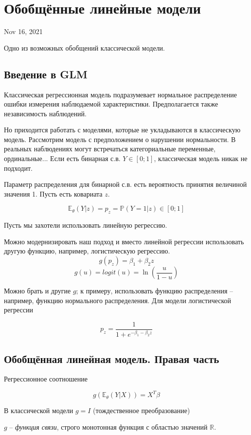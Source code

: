 \documentclass[main.tex]{subfiles}
\begin{document}
\section{ Обобщённые линейные модели}
Nov 16, 2021

Одно из возможных обобщений классической модели.

\subsection{Введение в GLM}

Классическая регрессионная модель подразумевает нормальное распределение ошибки измерения наблюдаемой характеристики.
Предполагается также независимость наблюдений.

Но приходится работать с моделями, которые не укладываются в классическую модель.
Рассмотрим модель с предположением о нарушении нормальности.
В реальных наблюдениях могут встречаться категориальные переменные, ординальные...
Если есть бинарная с.в. $ Y \in [0;1] $, классическая модель никак не подходит.

Параметр распределения для бинарной с.в. есть вероятность принятия величиной значения 1.
Пусть есть ковариата $z$.

\[ \mathds E_\theta (Y|z) = p_z = \mathds P(Y=1|z) \in [0;1] \]

Пусть мы захотели использовать линейную регрессию.


Можно модернизировать наш подход и вместо линейной регрессии использовать другую функцию, например, логистическую регрессию.
\[ g(p_z) = \beta_1 + \beta_2 z \]
\[ g(u) = logit(u) = \ln \left( \frac{u}{1-u} \right) \]

Можно брать и другие $g$; к примеру, использовать функцию распределения -- например, функцию нормального распределения.
Для модели логистической регрессии

\[ p_z = \frac{1}{1 + e^{- \beta_1 - \beta_2 z}} \]

\subsection{Обобщённая линейная модель. Правая часть}

Регрессионное соотношение

\[ g(\mathds E_\theta (Y|X)) = X^T \beta \]

В классической модели $ g = I $ (тождественное преобразование)

$ g $ -- \emph{функция связи}, строго монотонная функция с областью значений  $ \mathds R $.
\end{document}
